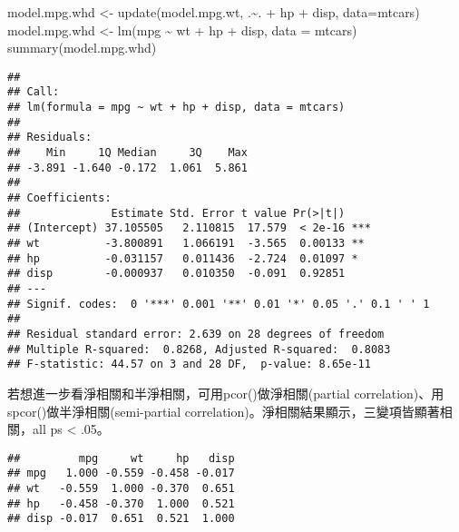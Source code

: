 \documentclass[
]{book}
\newenvironment{Shaded}{\begin{snugshade}}{\end{snugshade}}
\newcommand{\AttributeTok}[1]{\textcolor[rgb]{0.77,0.63,0.00}{#1}}
\newcommand{\CommentTok}[1]{\textcolor[rgb]{0.56,0.35,0.01}{\textit{#1}}}
\newcommand{\DecValTok}[1]{\textcolor[rgb]{0.00,0.00,0.81}{#1}}
\newcommand{\FunctionTok}[1]{\textcolor[rgb]{0.00,0.00,0.00}{#1}}
\newcommand{\NormalTok}[1]{#1}
\newcommand{\OtherTok}[1]{\textcolor[rgb]{0.56,0.35,0.01}{#1}}
\newcommand{\SpecialCharTok}[1]{\textcolor[rgb]{0.00,0.00,0.00}{#1}}
\begin{document}
\begin{Shaded}
\begin{Highlighting}[]
\NormalTok{model.mpg.whd }\OtherTok{\textless{}{-}} \FunctionTok{update}\NormalTok{(model.mpg.wt, .}\SpecialCharTok{\textasciitilde{}}\NormalTok{. }\SpecialCharTok{+}\NormalTok{ hp }\SpecialCharTok{+}\NormalTok{ disp, }\AttributeTok{data=}\NormalTok{mtcars)}
\NormalTok{model.mpg.whd }\OtherTok{\textless{}{-}} \FunctionTok{lm}\NormalTok{(mpg }\SpecialCharTok{\textasciitilde{}}\NormalTok{ wt }\SpecialCharTok{+}\NormalTok{ hp }\SpecialCharTok{+}\NormalTok{ disp, }\AttributeTok{data =}\NormalTok{ mtcars)}
\FunctionTok{summary}\NormalTok{(model.mpg.whd)}
\end{Highlighting}
\end{Shaded}

\begin{verbatim}
## 
## Call:
## lm(formula = mpg ~ wt + hp + disp, data = mtcars)
## 
## Residuals:
##    Min     1Q Median     3Q    Max 
## -3.891 -1.640 -0.172  1.061  5.861 
## 
## Coefficients:
##              Estimate Std. Error t value Pr(>|t|)    
## (Intercept) 37.105505   2.110815  17.579  < 2e-16 ***
## wt          -3.800891   1.066191  -3.565  0.00133 ** 
## hp          -0.031157   0.011436  -2.724  0.01097 *  
## disp        -0.000937   0.010350  -0.091  0.92851    
## ---
## Signif. codes:  0 '***' 0.001 '**' 0.01 '*' 0.05 '.' 0.1 ' ' 1
## 
## Residual standard error: 2.639 on 28 degrees of freedom
## Multiple R-squared:  0.8268, Adjusted R-squared:  0.8083 
## F-statistic: 44.57 on 3 and 28 DF,  p-value: 8.65e-11
\end{verbatim}

若想進一步看淨相關和半淨相關，可用pcor()做淨相關(partial correlation)、用spcor()做半淨相關(semi-partial correlation)。淨相關結果顯示，三變項皆顯著相關，all ps \textless{} .05。

\begin{Shaded}
\end{Shaded}

\begin{verbatim}
##         mpg     wt     hp   disp
## mpg   1.000 -0.559 -0.458 -0.017
## wt   -0.559  1.000 -0.370  0.651
## hp   -0.458 -0.370  1.000  0.521
## disp -0.017  0.651  0.521  1.000
\end{verbatim}
\end{document}
